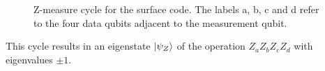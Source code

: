 \begin{figure}
    \centering
    \caption[Z-measure cycle for the surface code]{Z-measure cycle for the surface code. The labels a, b, c and d refer to the four data qubits adjacent to the measurement qubit.}
    \label{fig:Zmeasurecycle}
\end{figure}
This cycle results in an eigenstate $\ket{\psi_Z}$ of the operation $Z_aZ_bZ_cZ_d$ with eigenvalues $\pm 1$.

